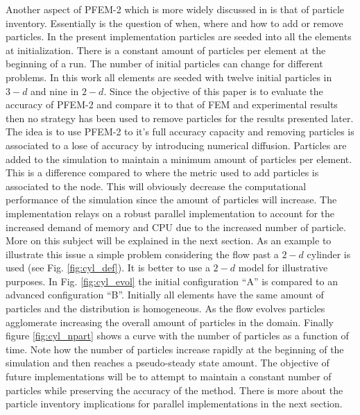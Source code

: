 Another aspect of PFEM-2 which is more widely discussed in \cite{gimenez-difusion} is that of particle inventory. Essentially is the question of when, where and how to add or remove particles. In the present implementation particles are seeded into all the elements at initialization. There is a constant amount of particles per element at the beginning of a run. The number of initial particles can change for different problems. In this work all elements are seeded with twelve initial particles in $3-d$ and nine in $2-d$. Since the objective of this paper is to evaluate the accuracy of PFEM-2 and compare it to that of FEM and experimental results then no strategy has been used to remove particles for the results presented later. The idea is to use PFEM-2 to it's full accuracy capacity and removing particles is associated to a lose of accuracy by introducing numerical diffusion. Particles are added to the simulation to maintain a minimum amount of particles per element. This is a difference compared to \cite{gimenez-difusion} where the metric used to add particles is associated to the node. This will obviously decrease the computational performance of the simulation since the amount of particles will increase. The implementation relays on a robust parallel implementation to account for the increased demand of memory and CPU due to the increased number of particle. More on this subject will be explained in the next section. As an example to illustrate this issue a simple problem considering the flow past a $2-d$ cylinder is used (see Fig. \ref{fig:cyl_def}). It is better to use a $2-d$ model for illustrative purposes. In Fig. \ref{fig:cyl_evol} the initial configuration ``A'' is compared to an advanced configuration ``B''. Initially all elements have the same amount of particles and the distribution is homogeneous. As the flow evolves particles agglomerate increasing the overall amount of particles in the domain. Finally figure \ref{fig:cyl_npart} shows a curve with the number of particles as a function of time. Note how the number of particles increase rapidly at the beginning of the simulation and then reaches a pseudo-steady state amount. The objective of future implementations will be to attempt to maintain a constant number of particles while preserving the accuracy of the method. There is more about the particle inventory implications for parallel implementations in the next section.
%
